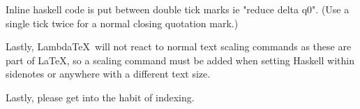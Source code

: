 Inline haskell code is put between double tick marks ie "reduce delta q0". (Use a single tick twice for a normal closing quotation mark.) 

Lastly, Lambda\TeX\ will not react to normal text scaling commands as these are part of \LaTeX, so a scaling command must be added when setting Haskell within sidenotes or anywhere with a different text size.

Lastly, please get into the habit of indexing.

